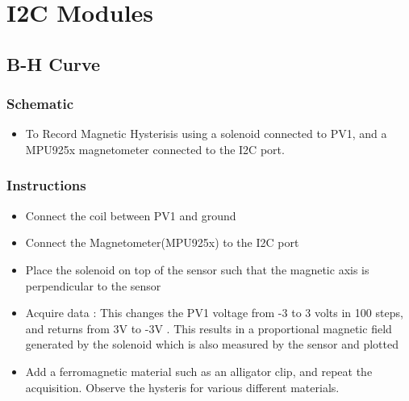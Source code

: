 \documentclass[a4paper,12pt,english]{sphinxmanual}
\begin{document}


\chapter{I2C Modules}
\label{\detokenize{index:i2c-modules}}

\section{B-H Curve}
\label{\detokenize{6.90:b-h-curve}}\label{\detokenize{6.90::doc}}

\subsection{Schematic}
\label{\detokenize{6.90:schematic}}\begin{itemize}
\item {} 
To Record Magnetic Hysterisis using a solenoid connected to PV1, and a MPU925x magnetometer connected to the I2C port.

\end{itemize}


\subsection{Instructions}
\label{\detokenize{6.90:instructions}}\begin{itemize}
\item {} 
Connect the coil between PV1 and ground

\item {} 
Connect the Magnetometer(MPU925x) to the I2C port

\item {} 
Place the solenoid on top of the sensor such that the magnetic axis is perpendicular to the sensor

\item {} 
Acquire data : This changes the PV1 voltage from -3 to 3 volts in 100 steps, and returns from 3V to -3V . This results in a proportional magnetic field generated by the solenoid which is also measured by the sensor and plotted

\item {} 
Add a ferromagnetic material such as an alligator clip, and repeat the acquisition. Observe the hysteris for various different materials.

\end{itemize}
\end{document}
